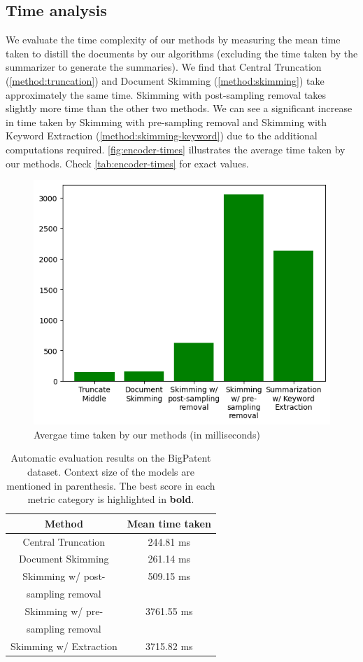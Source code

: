 \subsection*{Time analysis}

We evaluate the time complexity of our methods by measuring the mean time taken to distill the
documents by our algorithms (excluding the time taken by the summarizer to generate the summaries).
We find that Central Truncation (\ref{method:truncation}) and Document Skimming
(\ref{method:skimming}) take approximately the same time.
Skimming with post-sampling removal takes slightly more time than the other two methods.
We can see a significant increase in time taken by Skimming with pre-sampling removal and Skimming
with Keyword Extraction (\ref{method:skimming-keyword}) due to the additional computations required.
\autoref{fig:encoder-times} illustrates the average time taken by our methods.
Check \autoref{tab:encoder-times} for exact values.

\begin{figure}[!ht]
	\centering
	\includegraphics[width=.48\textwidth]{Images/encoder-times.png}
	\caption{Avergae time taken by our methods (in milliseconds)}
	\label{fig:encoder-times}
\end{figure}

\begin{table}[!ht]
	\centering

	\begin{tabular}{c c}
		\hline
		\textbf{Method} & \textbf{Mean time taken} \\
		\hline
		Central Truncation & 244.81 ms \\
		Document Skimming & 261.14 ms \\
		Skimming w/ post- & 509.15 ms \\
		sampling removal & \\
		Skimming w/ pre- & 3761.55 ms \\
		sampling removal & \\
		Skimming w/ Extraction & 3715.82 ms \\
		\hline
	\end{tabular}

	\caption{Automatic evaluation results on the BigPatent dataset. Context size of the models are
	mentioned in parenthesis. The best score in each metric category is highlighted in \textbf{bold}.}
	\label{tab:encoder-times}
\end{table}

